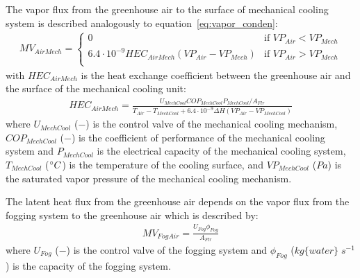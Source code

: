 \documentclass[a4paper]{article}
\begin{document}
The vapor flux from the greenhouse air to the surface of mechanical cooling system is described analogously to equation~\eqref{eq:vapor_conden}:
\begin{align}
  MV_{AirMech} = \begin{cases}
    0                                                     & \text{if~} VP_{Air} < VP_{Mech} \\
    6.4 \cdot 10^{-9} HEC_{AirMech}(VP_{Air} - VP_{Mech}) & \text{if~} VP_{Air} > VP_{Mech} \\
  \end{cases}
\end{align}
with \(HEC_{AirMech}\) is the heat exchange coefficient between the greenhouse air and the surface of the mechanical cooling unit:
\begin{align}
  HEC_{AirMech} = \frac{U_{MechCool} COP_{MechCool} P_{MechCool} / A_{Flr}}{T_{Air} - T_{MechCool} + 6.4 \cdot 10^{-9} \Delta H(VP_{Air} - VP_{MechCool})}
\end{align}
where \(U_{MechCool}\) (\(-\)) is the control valve of the mechanical cooling mechanism, \(COP_{MechCool}\) (\(-\)) is the coefficient of performance of the mechanical cooling system and \(P_{MechCool}\) is the electrical capacity of the mechanical cooling system, \(T_{MechCool}\) (\(\degree C\)) is the temperature of the cooling surface, and \(VP_{MechCool}\) (\(Pa\)) is the saturated vapor pressure of the mechanical cooling mechanism.

The latent heat flux from the greenhouse air depends on the vapor flux from the fogging system to the greenhouse air which is described by:
\begin{align}
  MV_{FogAir} = \frac{U_{Fog} \phi_{Fog}}{A_{Flr}}
\end{align}
where \(U_{Fog}\) (\(-\)) is the control valve of the fogging system and \(\phi_{Fog}\) (\(kg\{water\}\;s^{-1}\)) is the capacity of the fogging system.
\end{document}
